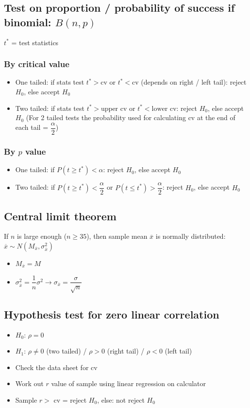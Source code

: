 \documentclass[A4paper, 11pt]{article}
\begin{document}
	\subsection{Test on proportion / probability of success if binomial: $B(n,p)$}
	$t^*$ = test statistics
	\subsubsection{By critical value}
	\begin{itemize}
		\item One tailed: if stats test $t^* > \text{cv}$ or $t^* < \text{cv}$ (depends on right / left tail): reject $H_0$, else accept $H_0$
		\item Two tailed: if stats test $t^* > \text{upper cv}$ or $t^* < \text{lower cv}$: reject $H_0$, else accept $H_0$ (For 2 tailed tests the probability used for calculating cv at the end of each tail = $\dfrac{\alpha}{2}$)
	\end{itemize}
	
	
	\subsubsection{By $p$ value}
	\begin{itemize}
		\item One tailed: if $P(t\geq t^*) < \alpha$: reject $H_0$, else accept $H_0$
		\item Two tailed: if $P(t\geq t^*) < \dfrac{\alpha}{2}$ or $P(t\leq t^*) > \dfrac{\alpha}{2}$: reject $H_0$, else accept $H_0$
	\end{itemize}
	
	\subsection{Central limit theorem}
	If $n$ is large enough ($n\geq35$), then sample mean $\overline{x}$ is normally distributed: $\overline{x} \sim N(M_{\overline{x}}, \sigma_{\overline{x}}^2)$
	\begin{itemize}
		\item $M_{\overline{x}}=M$
		\item $\sigma_{\overline{x}}^2=\dfrac{1}{n}\sigma^2 \rightarrow \sigma_{\overline{x}} = \dfrac{\sigma}{\sqrt{n}}$
	\end{itemize}
	
	\subsection{Hypothesis test for zero linear correlation}
	\begin{itemize}
		\item $H_0$: $\rho = 0$
		\item $H_1$: $\rho \neq 0$ (two tailed) / $\rho > 0$ (right tail) / $\rho < 0$ (left tail)
		\item Check the data sheet for cv
		\item Work out $r$ value of sample using linear regression on calculator
		\item Sample $r >$ cv = reject $H_0$, else: not reject $H_0$
	\end{itemize}
	
\end{document}
